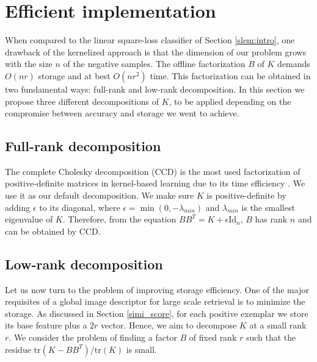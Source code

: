 
\section{Efficient implementation}\label{eff_imp}


When compared to the linear square-loss classifier of Section \ref{slem:intro}, one drawback of the kernelized approach is that the dimension of our problem grows with the size $n$ of the negative samples. The offline factorization $B$ of $K$ demands $O(nr)$ storage and at best $O(nr^2)$ time. 
This factorization can be obtained in two fundamental ways: full-rank and low-rank decomposition. In this section we propose three different decompositions of $K$, to be applied depending on the compromise between accuracy and storage we went to achieve.


\subsection{Full-rank decomposition}
The complete Cholesky decomposition (CCD) is the most used factorization of positive-definite matrices in kernel-based learning due to its time efficiency \cite{BaJo02}. We use it as our default decomposition.
We make sure $K$ is positive-definite by adding $\epsilon$ to its diagonal, where $\epsilon=\min(0,-\lambda_{min})$ and $\lambda_{min}$ is the smallest eigenvalue of $K$. Therefore, from the equation $BB^T=K+\epsilon\mathrm{Id}_n$, $B$ has rank $n$ and can be obtained by CCD.

\subsection{Low-rank decomposition}
Let us now turn to the problem of improving storage efficiency. One of the major requisites of a global image descriptor for large scale retrieval is to minimize the storage.
As discussed in Section \ref{simi_score}, for each positive exemplar we store its base feature plus a $2r$ vector. Hence, we aim to decompose $K$ at a small rank $r$.
We consider the problem of finding a factor $B$ of fixed rank $r$ such that the residue $\mathrm{tr}(K-BB^T)/\mathrm{tr}(K)$ is small. 


